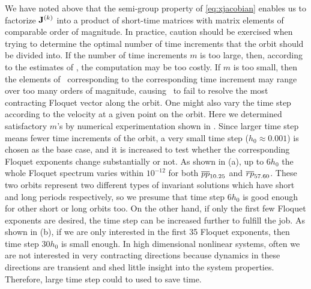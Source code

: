 \documentclass[final,leqno,onefignum,onetabnum]{siamltexmm}
\begin{document}
We have noted above that the {semi-group property of \JacobianM}
\eqref{eq:xjacobian} enables us to factorize
$\mathbf{J}^{(k)}$ into a product of short-time matrices with matrix
elements of comparable {order of magnitude}. In practice, caution should be
exercised when trying to determine the optimal number of time increments
that the orbit should be divided into. If the number of time increments
$m$ is too large, then, according to the estimates of
, the computation may be too costly. If $m$ is too
small, then the elements of \JacobianM\ corresponding to the
corresponding time increment may range over too many orders of magnitude,
causing \ped\ to fail to resolve the most contracting Floquet vector
along the orbit. One
might also vary the time step according to the velocity at a given point
on the orbit. Here we determined satisfactory $m$'s by numerical
experimentation shown in . Since larger time step means
fewer time increments of the orbit, a very small time step ($h_0 \approx 0.001$)
is chosen as the base case, and it is increased to test whether the
corresponding Floquet exponents change substantially or not. As shown in
 (a), up to $6h_0$ the whole Floquet spectrum varies within
$10^{-12}$ for both ${\overline{pp}}_{10.25}$ and ${\overline{rp}}_{57.60}$. These
two orbits represent two different types of invariant solutions which have
short and long periods respectively,
so we presume that time step $6h_0$ is good enough
for other short or long orbits too. On the other hand, if only the first
few Floquet exponents are desired, the time step can be increased further
to fulfill the job. As shown in  (b), if we are only
interested in the first 35 Floquet exponents, then time step $30h_0$ is small
enough. In high dimensional nonlinear systems, often we are not interested in {very contracting
directions because dynamics in these directions are transient} and shed little
insight into the system properties. Therefore, large time step could to used to
save time.
\end{document}
